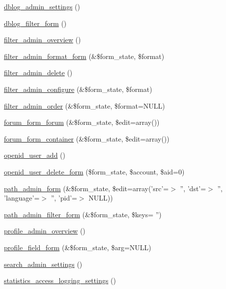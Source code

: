 \begin{CompactItemize}
\hyperlink{group__forms_g6447ffdcc2e017bea1328ce4b314edfd}{dblog\_\-admin\_\-settings} ()
\item 
\hyperlink{group__forms_g2e2048171c96832b8d9d1b33252abb5b}{dblog\_\-filter\_\-form} ()
\item 
\hyperlink{group__forms_gfef1e200ed76ee122718a52cf9abb0f2}{filter\_\-admin\_\-overview} ()
\item 
\hyperlink{group__forms_gfa40bd6f3659ac2e8980f5b30d263ab2}{filter\_\-admin\_\-format\_\-form} (\&\$form\_\-state, \$format)
\item 
\hyperlink{group__forms_g950ad134c292688bc709871c65745dda}{filter\_\-admin\_\-delete} ()
\item 
\hyperlink{group__forms_gcc23b948cf6b65bf3fb1febee5a51beb}{filter\_\-admin\_\-configure} (\&\$form\_\-state, \$format)
\item 
\hyperlink{group__forms_g6f9ec0dfed0e7f095f0f99f731d084be}{filter\_\-admin\_\-order} (\&\$form\_\-state, \$format=NULL)
\item 
\hyperlink{group__forms_ge41c2269ce5b8656e54175970197d345}{forum\_\-form\_\-forum} (\&\$form\_\-state, \$edit=array())
\item 
\hyperlink{group__forms_g00821d767c47cbcebe320c02516743a5}{forum\_\-form\_\-container} (\&\$form\_\-state, \$edit=array())
\item 
\hyperlink{group__forms_g53081778c1fc8e8ff8ab89f9000774b7}{openid\_\-user\_\-add} ()
\item 
\hyperlink{group__forms_g7c3c27b57a24d9eba5aaf93482f21bb7}{openid\_\-user\_\-delete\_\-form} (\$form\_\-state, \$account, \$aid=0)
\item 
\hyperlink{group__forms_gbd04af41e3afa56ef5dd7bffdeea7459}{path\_\-admin\_\-form} (\&\$form\_\-state, \$edit=array('src'=$>$ '', 'dst'=$>$ '', 'language'=$>$ '', 'pid'=$>$ NULL))
\item 
\hyperlink{group__forms_g7596ad03b96a0cf739d4d33a5fb2fd71}{path\_\-admin\_\-filter\_\-form} (\&\$form\_\-state, \$keys= '')
\item 
\hyperlink{group__forms_gf5de7da6a31a83a313aa279ec696e82c}{profile\_\-admin\_\-overview} ()
\item 
\hyperlink{group__forms_g48b4a6628f7c40544ce7656a61eb6f69}{profile\_\-field\_\-form} (\&\$form\_\-state, \$arg=NULL)
\item 
\hyperlink{group__forms_g9441f1f43f030e4a7fd39a7470e22f5f}{search\_\-admin\_\-settings} ()
\item 
\hyperlink{group__forms_g78aa8d75d57df6385e2c3c24697ce2a9}{statistics\_\-access\_\-logging\_\-settings} ()

\end{CompactItemize}

